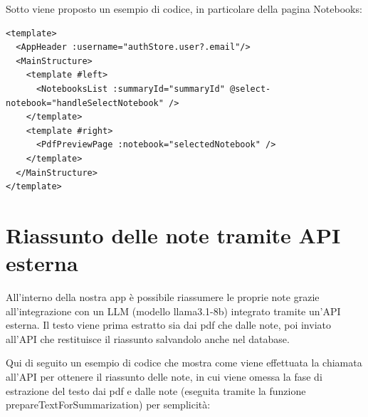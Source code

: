 Sotto viene proposto un esempio di codice, in particolare della pagina Notebooks:
\begin{lstlisting}[style=html, caption=Struttura Vue della pagina Notebooks]
<template>
  <AppHeader :username="authStore.user?.email"/>
  <MainStructure>
    <template #left>
      <NotebooksList :summaryId="summaryId" @select-notebook="handleSelectNotebook" />
    </template>
    <template #right>
      <PdfPreviewPage :notebook="selectedNotebook" />
    </template>
  </MainStructure>
</template>
\end{lstlisting}

\section{Riassunto delle note tramite API esterna}
All'interno della nostra app è possibile riassumere le proprie note grazie all'integrazione con un LLM (modello llama3.1-8b) integrato tramite un'API esterna. Il testo viene prima estratto sia dai pdf che dalle note, poi inviato all'API che restituisce il riassunto salvandolo anche nel database.

Qui di seguito un esempio di codice che mostra come viene effettuata la chiamata all'API per ottenere il riassunto delle note, in cui viene omessa la fase di estrazione del testo dai pdf e dalle note (eseguita tramite la funzione prepareTextForSummarization) per semplicità:


